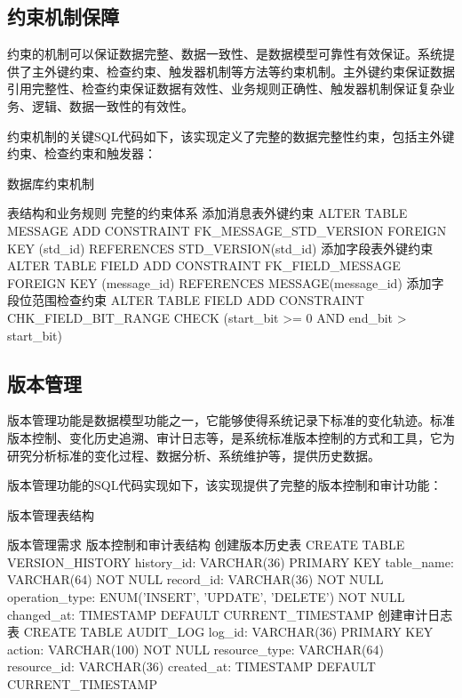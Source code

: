 \subsection{约束机制保障}

约束的机制可以保证数据完整、数据一致性、是数据模型可靠性有效保证。系统提供了主外键约束、检查约束、触发器机制等方法等约束机制。主外键约束保证数据引用完整性、检查约束保证数据有效性、业务规则正确性、触发器机制保证复杂业务、逻辑、数据一致性的有效性。

约束机制的关键SQL代码如下，该实现定义了完整的数据完整性约束，包括主外键约束、检查约束和触发器：

\begin{algorithm}[H]
\caption{数据库约束机制}
\begin{algorithmic}[1]
\REQUIRE 表结构和业务规则
\ENSURE 完整的约束体系
\STATE 添加消息表外键约束
\STATE ALTER TABLE MESSAGE
\STATE ADD CONSTRAINT FK\_MESSAGE\_STD\_VERSION
\STATE FOREIGN KEY (std\_id) REFERENCES STD\_VERSION(std\_id)
\STATE 添加字段表外键约束
\STATE ALTER TABLE FIELD
\STATE ADD CONSTRAINT FK\_FIELD\_MESSAGE
\STATE FOREIGN KEY (message\_id) REFERENCES MESSAGE(message\_id)
\STATE 添加字段位范围检查约束
\STATE ALTER TABLE FIELD
\STATE ADD CONSTRAINT CHK\_FIELD\_BIT\_RANGE
\STATE CHECK (start\_bit >= 0 AND end\_bit > start\_bit)
\end{algorithmic}
\end{algorithm}
\subsection{版本管理}
版本管理功能是数据模型功能之一，它能够使得系统记录下标准的变化轨迹。标准版本控制、变化历史追溯、审计日志等，是系统标准版本控制的方式和工具，它为研究分析标准的变化过程、数据分析、系统维护等，提供历史数据。

版本管理功能的SQL代码实现如下，该实现提供了完整的版本控制和审计功能：

\begin{algorithm}[H]
\caption{版本管理表结构}
\begin{algorithmic}[1]
\REQUIRE 版本管理需求
\ENSURE 版本控制和审计表结构
\STATE 创建版本历史表
\STATE CREATE TABLE VERSION\_HISTORY
\STATE history\_id: VARCHAR(36) PRIMARY KEY
\STATE table\_name: VARCHAR(64) NOT NULL
\STATE record\_id: VARCHAR(36) NOT NULL
\STATE operation\_type: ENUM('INSERT', 'UPDATE', 'DELETE') NOT NULL
\STATE changed\_at: TIMESTAMP DEFAULT CURRENT\_TIMESTAMP
\STATE 创建审计日志表
\STATE CREATE TABLE AUDIT\_LOG
\STATE log\_id: VARCHAR(36) PRIMARY KEY
\STATE action: VARCHAR(100) NOT NULL
\STATE resource\_type: VARCHAR(64)
\STATE resource\_id: VARCHAR(36)
\STATE created\_at: TIMESTAMP DEFAULT CURRENT\_TIMESTAMP
\end{algorithmic}
\end{algorithm}



